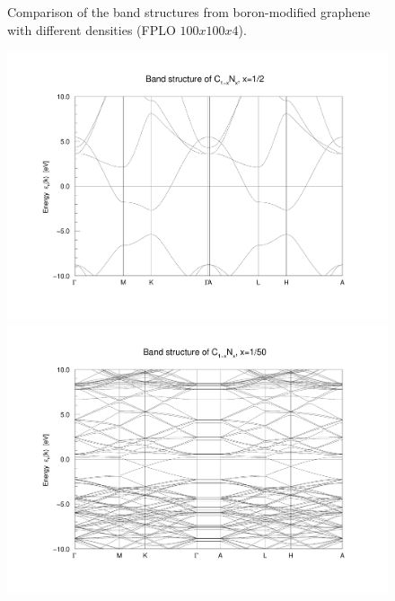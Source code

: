 \begin{figure}
\begin{minipage}[t]{0.3\textwidth}
					\end{minipage}															
					\caption{Comparison of the band structures from boron-modified graphene with different densities (FPLO $100x100x4$).}
					\label{fig:BoronDensityComparisson}
				\end{figure}				
				\begin{figure}
					\begin{minipage}[t]{0.9\textwidth}
						\includegraphics[width=\textwidth]{Results/Nitrogen/Nitrogen1/nitrogen1band.pdf}
					\end{minipage}
					\begin{minipage}[t]{0.9\textwidth}
						\includegraphics[width=\textwidth]{Results/Nitrogen/Nitrogen5/nitrogen5band.pdf}
					\end{minipage}
					\begin{minipage}[t]{0.3\textwidth}

\end{minipage}
\end{figure}
